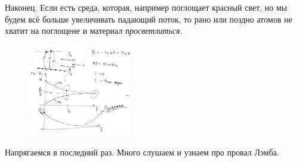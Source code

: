 Наконец. Если есть среда, которая, например поглощает красный свет, но мы будем всё больше увеличивать падающий поток, то рано или поздно атомов не хватит на поглощене и материал \textit{просветлиться}.
\begin{figure}[ht]
    \centering
    \includegraphics[width=0.4\textwidth]{img/lec_6_zerg.png}
\end{figure}


Напрягаемся в последний раз. Много слушаем и узнаем про провал Лэмба.